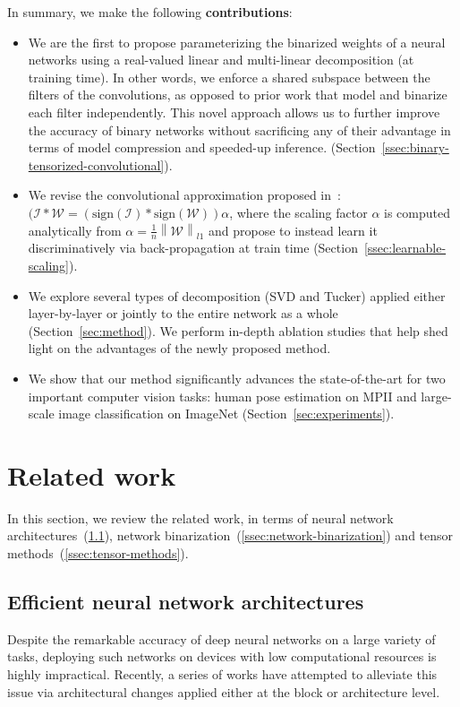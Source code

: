 \documentclass[10pt,twocolumn,letterpaper]{article}
\newcommand{\norm}[1]{\left\lVert#1\right\rVert}
\newcommand{\mytensor}[1]{\ensuremath{\mathcal{#1}}}
\begin{document}
In summary, we make the following \textbf{contributions}:
\begin{itemize}
    \item We are the first to propose parameterizing the binarized weights of a neural networks using a real-valued linear and multi-linear decomposition (at training time). In other words, we enforce a shared subspace between the filters of the convolutions, as opposed to prior work that model and binarize each filter independently. This novel approach allows us to further improve the accuracy of binary networks
    without sacrificing any of their advantage in terms of model compression and speeded-up inference.
    (Section~\ref{ssec:binary-tensorized-convolutional}).
    
    \item We revise the convolutional approximation proposed in~\cite{rastegari2016xnor}: $(\mytensor{I} * \mytensor{W} = (\text{sign}(\mytensor{I}) * \text{sign}(\mytensor{W}))\alpha $, where the scaling factor $\alpha$ is computed analytically from  $\alpha = \frac{1}{n}\norm{\mytensor{W}}_{l1}$ and propose to instead learn it discriminatively via back-propagation at train time (Section~\ref{ssec:learnable-scaling}).
    
    \item We explore several types of decomposition (SVD and Tucker) applied either layer-by-layer or jointly to the entire network as a whole (Section~\ref{sec:method}). We perform in-depth ablation studies that help shed light on the advantages of the newly proposed method.
    
    \item We show that our method significantly advances the state-of-the-art for two important computer vision tasks: human pose estimation on MPII and large-scale image classification on ImageNet (Section~\ref{sec:experiments}).
\end{itemize} \section{Related work}\label{sec:related-work}
In this section, we review the related work, in terms of neural network architectures~(\ref{ssec:efficient-cnns}), network binarization~(\ref{ssec:network-binarization}) and tensor methods~(\ref{ssec:tensor-methods}).

\subsection{Efficient neural network architectures}\label{ssec:efficient-cnns}
 Despite the remarkable accuracy of deep neural networks on a large variety of tasks, deploying such networks on devices with low computational resources is highly impractical. Recently, a series of works have attempted to alleviate this issue via architectural changes applied either at the block or architecture level.
\end{document}
